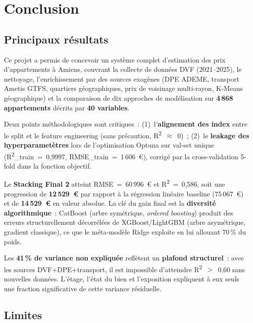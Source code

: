 \documentclass[12pt,a4paper]{article}
\begin{document}
\newpage
\section{Conclusion}
\label{sec:conclusion}

\subsection{Principaux r\'esultats}

Ce projet a permis de concevoir un syst\`eme complet d'estimation des prix d'appartements \`a Amiens, couvrant la collecte de donn\'ees DVF (2021--2025), le nettoyage, l'enrichissement par des sources exog\`enes (DPE ADEME, transport Ametis GTFS, quartiers g\'eographiques, prix de voisinage multi-rayon, K-Means g\'eographique) et la comparaison de dix approches de mod\'elisation sur \textbf{4\,868 appartements} d\'ecrits par \textbf{40 variables}.

Deux points m\'ethodologiques sont critiques~: (1)~l'\textbf{alignement des index} entre le split et le feature engineering (sans pr\'ecaution, R\textsuperscript{2}~$\approx$~0)~; (2)~le \textbf{leakage des hyperparamet\`etres} lors de l'optimisation Optuna sur val-set unique (R\textsuperscript{2}\_train~=~0{,}9997, RMSE\_train~=~1\,606~\euro), corrig\'e par la cross-validation 5-fold dans la fonction objectif.

Le \textbf{Stacking Final 2} atteint RMSE~=~60\,996~\euro{} et R\textsuperscript{2}~=~0{,}586, soit une progression de \textbf{12\,529~\euro} par rapport \`a la r\'egression lin\'eaire baseline (75\,067~\euro) et de \textbf{14\,529~\euro} en valeur absolue. La cl\'e du gain final est la \textbf{diversit\'e algorithmique}~: CatBoost (arbre sym\'etrique, \textit{ordered boosting}) produit des erreurs structurellement d\'ecorr\'el\'ees de XGBoost/LightGBM (arbre asym\'etrique, gradient classique), ce que le m\'eta-mod\`ele Ridge exploite en lui allouant 70\,\% du poids.

Les \textbf{41\,\% de variance non expliqu\'ee} refl\`etent un \textbf{plafond structurel}~: avec les sources DVF+DPE+transport, il est impossible d'atteindre R\textsuperscript{2}~$>$~0{,}60 sans nouvelles donn\'ees. L'\'etage, l'\'etat du bien et l'exposition expliquent \`a eux seuls une fraction significative de cette variance r\'esiduelle.

\subsection{Limites}
\end{document}
